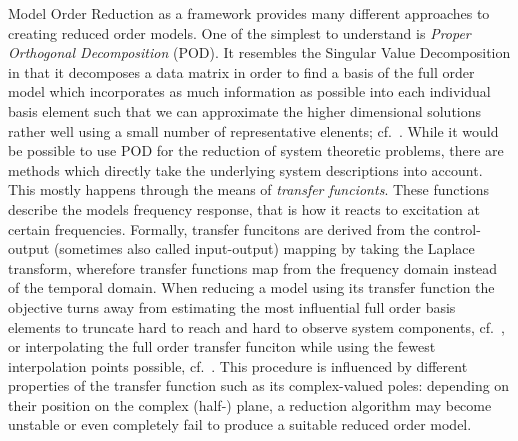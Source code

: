 Model Order Reduction as a framework provides many different approaches to creating reduced order models.
One of the simplest to understand is \emph{Proper Orthogonal Decomposition} (POD).
It resembles the Singular Value Decomposition in that it decomposes a data matrix in order to find a basis of the full order model which incorporates as much information as possible into each individual basis element such that we can approximate the higher dimensional solutions rather well using a small number of representative elenents; cf.~\cite{Hotelling1936, Karhunen1946, Pinnau2008}.
While it would be possible to use POD for the reduction of system theoretic problems, there are methods which directly take the underlying system descriptions into account.
This mostly happens through the means of \emph{transfer funcionts}.
These functions describe the models frequency response, that is how it reacts to excitation at certain frequencies.
Formally, transfer funcitons are derived from the control-output (sometimes also called input-output) mapping by taking the Laplace transform, wherefore transfer functions map from the frequency domain instead of the temporal domain.
When reducing a model using its transfer function the objective turns away from estimating the most influential full order basis elements to truncate hard to reach and hard to observe system components, cf.~\cite{Moore1981, Enns1984, Antoulas2005, Gugercin2007, BB2017}, or interpolating the full order transfer funciton while using the fewest interpolation points possible, cf.~\cite{Antoulas2005, Gugercin2009, Beattie2017}.
This procedure is influenced by different properties of the transfer function such as its complex-valued poles: depending on their position on the complex (half-) plane, a reduction algorithm may become unstable or even completely fail to produce a suitable reduced order model.

